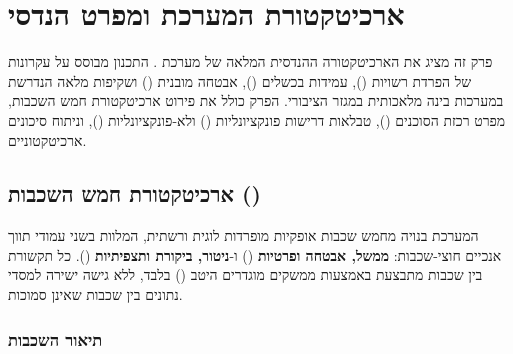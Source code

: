 \chapter{ארכיטקטורת המערכת ומפרט הנדסי}
\label{ch:architecture}

פרק זה מציג את הארכיטקטורה ההנדסית המלאה של מערכת . התכנון מבוסס על עקרונות של הפרדת רשויות (), עמידות בכשלים (), אבטחה מובנית () ושקיפות מלאה הנדרשת במערכות בינה מלאכותית במגזר הציבורי. הפרק כולל את פירוט ארכיטקטורת חמש השכבות, מפרט רכזת הסוכנים (), טבלאות דרישות פונקציונליות () ולא-פונקציונליות (), וניתוח סיכונים ארכיטקטוניים.

\section{ארכיטקטורת חמש השכבות ()}
\label{sec:five-layer}

המערכת בנויה מחמש שכבות אופקיות מופרדות לוגית ורשתית, המלוות בשני עמודי תווך אנכיים חוצי-שכבות: \textbf{ממשל, אבטחה ופרטיות} () ו-\textbf{ניטור, ביקורת ותצפיתיות} (). כל תקשורת בין שכבות מתבצעת באמצעות ממשקים מוגדרים היטב () בלבד, ללא גישה ישירה למסדי נתונים בין שכבות שאינן סמוכות.

\subsection{תיאור השכבות}

